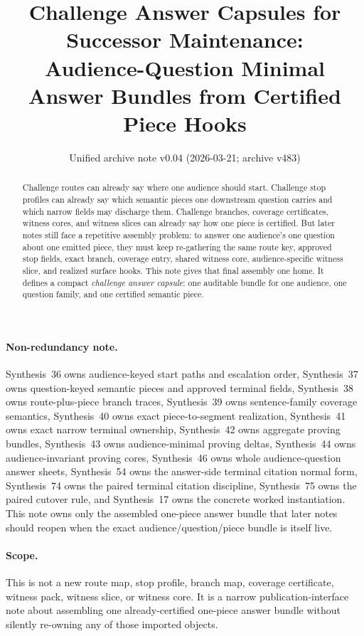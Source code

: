 \documentclass[11pt]{article}
\title{Challenge Answer Capsules for Successor Maintenance:\\[0.5ex]
\large Audience-Question Minimal Answer Bundles from Certified Piece Hooks}
\author{}
\date{Unified archive note v0.04 (2026-03-21; archive v483)}
\begin{document}
\maketitle

\begin{abstract}
Challenge routes can already say where one audience should start.
Challenge stop profiles can already say which semantic pieces one downstream question carries and which narrow fields may discharge them.
Challenge branches, coverage certificates, witness cores, and witness slices can already say how one piece is certified.
But later notes still face a repetitive assembly problem: to answer one audience's one question about one emitted piece, they must keep re-gathering the same route key, approved stop fields, exact branch, coverage entry, shared witness core, audience-specific witness slice, and realized surface hooks.
This note gives that final assembly one home.
It defines a compact \emph{challenge answer capsule}: one auditable bundle for one audience, one question family, and one certified semantic piece.
\end{abstract}

\paragraph{Non-redundancy note.}
Synthesis~36 owns audience-keyed start paths and escalation order, Synthesis~37 owns question-keyed semantic pieces and approved terminal fields, Synthesis~38 owns route-plus-piece branch traces, Synthesis~39 owns sentence-family coverage semantics, Synthesis~40 owns exact piece-to-segment realization, Synthesis~41 owns exact narrow terminal ownership, Synthesis~42 owns aggregate proving bundles, Synthesis~43 owns audience-minimal proving deltas, Synthesis~44 owns audience-invariant proving cores, Synthesis~46 owns whole audience-question answer sheets, Synthesis~54 owns the answer-side terminal citation normal form, Synthesis~74 owns the paired terminal citation discipline, Synthesis~75 owns the paired cutover rule, and Synthesis~17 owns the concrete worked instantiation.
This note owns only the assembled one-piece answer bundle that later notes should reopen when the exact audience/question/piece bundle is itself live.

\paragraph{Scope.}
This is not a new route map, stop profile, branch map, coverage certificate, witness pack, witness slice, or witness core.
It is a narrow publication-interface note about assembling one already-certified one-piece answer bundle without silently re-owning any of those imported objects.
\end{document}
